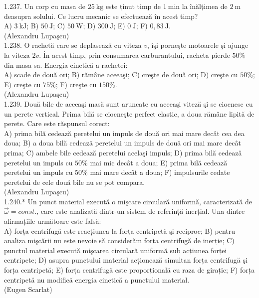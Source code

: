 1.237. Un corp cu masa de $25 \mathrm{~kg}$ este ținut timp de $1 \mathrm{~min}$ la înălțimea de $2 \mathrm{~m}$ deasupra solului. Ce lucru mecanic se efectuează în acest timp?\\ A) $3 \mathrm{~kJ}$; B) $50 \mathrm{~J}$; C) $50 \mathrm{~W}$; D) $300 \mathrm{~J}$; E) $0 \mathrm{~J}$; F) $0,83 \mathrm{~J}$.\\ (Alexandru Lupaşcu)\\

1.238. O rachetă care se deplasează cu viteza $v$, îşi porneşte motoarele şi ajunge la viteza $2 v$. În acest timp, prin consumarea carburantului, racheta pierde $50 \%$ din masa sa. Energia cinetică a rachetei:\\ A) scade de două ori; B) rămâne aceeaşi; C) creşte de două ori; D) creşte cu $50 \%$; E) creşte cu $75 \%$; F) creşte cu $150 \%$.\\ (Alexandru Lupaşcu)\\

1.239. Două bile de aceeaşi masă sunt aruncate cu aceeaşi viteză şi se ciocnesc cu un perete vertical. Prima bilă se ciocneşte perfect elastic, a doua rămâne lipită de perete. Care este răspunsul corect:\\ A) prima bilă cedează peretelui un impuls de două ori mai mare decât cea dea doua; B) a doua bilă cedează peretelui un impuls de două ori mai mare decât prima; C) ambele bile cedează peretelui acelaşi impuls; D) prima bilă cedează peretelui un impuls cu $50 \%$ mai mic decât a doua; E) prima bilă cedează peretelui un impuls cu $50 \%$ mai mare decât a doua; F) impulsurile cedate peretelui de cele două bile nu se pot compara.\\ (Alexandru Lupaşcu)\\

1.240.* Un punct material execută o mişcare circulară uniformă, caracterizată de $\vec{\omega}=const.$, care este analizată dintr-un sistem de referință inerțial. Una dintre afirmațiile următoare este falsă:\\ A) forța centrifugă este reacțiunea la forța centripetă şi reciproc; B) pentru analiza mişcării nu este nevoie să considerăm forța centrifugă de inerție; C) punctul material execută mişcarea circulară uniformă sub acțiunea forței centripete; D) asupra punctului material acționează simultan forța centrifugă şi forța centripetă; E) forța centrifugă este proporțională cu raza de girație; F) forța centripetă nu modifică energia cinetică a punctului material.\\ (Eugen Scarlat)\\

